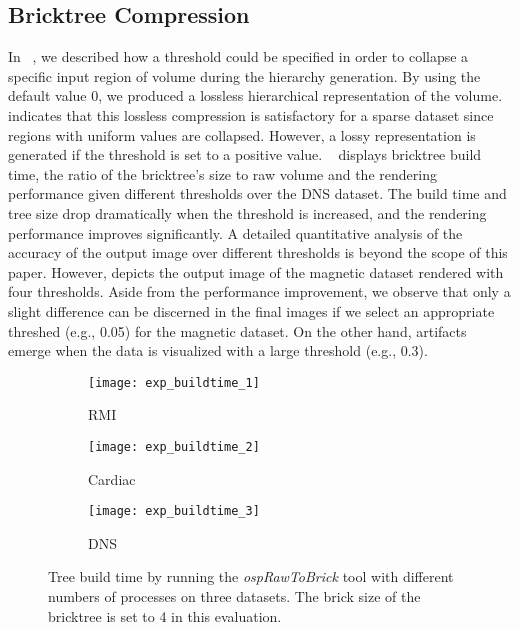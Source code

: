 \subsection{Bricktree Compression}
In ~, we described how a threshold could be specified 
in order to collapse a specific input region of volume during the hierarchy generation.
By using the default value 0, we produced a lossless hierarchical representation of
the volume.  indicates that this lossless compression
is satisfactory for a sparse dataset since regions with uniform values
are collapsed. However, a lossy representation is generated if the threshold is
set to a positive value. ~ displays bricktree build time,
the ratio of the bricktree's size to raw volume and the rendering performance given different 
thresholds over the DNS dataset. The build time and tree size drop dramatically when 
the threshold is increased, and the rendering performance improves significantly. 
A detailed quantitative analysis of the accuracy of the output image over different 
thresholds is beyond the scope of this paper.
However, 
depicts the output image of the magnetic dataset rendered with four thresholds. Aside from the performance improvement, 
we observe that only a slight difference can be discerned in the final images if we select an appropriate threshed (e.g., 0.05) for the magnetic dataset.
On the other hand, artifacts emerge when the data is visualized with a large threshold (e.g., 0.3).

\begin{figure}[h]
    \centering
    \begin{subfigure}[b]{0.32\columnwidth}
        \texttt{[image: exp\_buildtime\_1]}
        \vspace{-1.5em}
        \caption{RMI}
        \label{fig:exp_buildtime_1}
    \end{subfigure}
    \begin{subfigure}[b]{0.32\columnwidth}
        \texttt{[image: exp\_buildtime\_2]}
        \vspace{-1.5em}
        \caption{Cardiac}
        \label{fig:exp_buildtime_2}
    \end{subfigure}
    \begin{subfigure}[b]{0.32\columnwidth}
        \texttt{[image: exp\_buildtime\_3]}
        \vspace{-1.5em}
        \caption{DNS}
        \label{fig:exp_buildtime_3}
    \end{subfigure}
   
	\caption{\label{fig:exp_buildtime}%
	Tree build time by running the \textit{ospRawToBrick} tool with different numbers of processes on three datasets. The brick size of the bricktree is set to 4 in this evaluation.}
	\vspace{-0.5em}
\end{figure}

